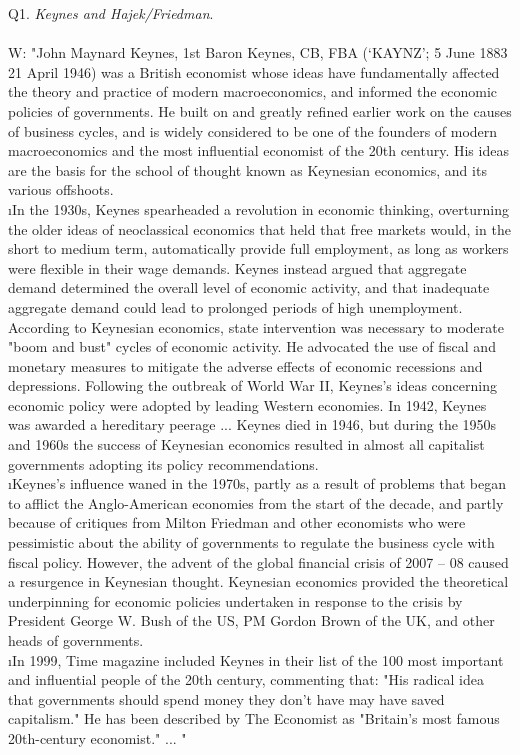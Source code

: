 \documentclass[12pt]{article}
\begin{document}
\ni Q1.  {\it Keynes and Hajek/Friedman}. \\
 \\
W: "John Maynard Keynes, 1st Baron Keynes, CB, FBA (`KAYNZ'; 5 June 1883  21 April 1946) was a British economist whose ideas have fundamentally affected the theory and practice of modern macroeconomics, and informed the economic policies of governments. He built on and greatly refined earlier work on the causes of business cycles, and is widely considered to be one of the founders of modern macroeconomics and the most influential economist of the 20th century. His ideas are the basis for the school of thought known as Keynesian economics, and its various offshoots. \\
\i In the 1930s, Keynes spearheaded a revolution in economic thinking, overturning the older ideas of neoclassical economics that held that free markets would, in the short to medium term, automatically provide full employment, as long as workers were flexible in their wage demands. Keynes instead argued that aggregate demand determined the overall level of economic activity, and that inadequate aggregate demand could lead to prolonged periods of high unemployment. According to Keynesian economics, state intervention was necessary to moderate "boom and bust" cycles of economic activity. He advocated the use of fiscal and monetary measures to mitigate the adverse effects of economic recessions and depressions. Following the outbreak of World War II, Keynes's ideas concerning economic policy were adopted by leading Western economies. In 1942, Keynes was awarded a hereditary peerage ... Keynes died in 1946, but during the 1950s and 1960s the success of Keynesian economics resulted in almost all capitalist governments adopting its policy recommendations. \\
\i Keynes's influence waned in the 1970s, partly as a result of problems that began to afflict the Anglo-American economies from the start of the decade, and partly because of critiques from Milton Friedman and other economists who were pessimistic about the ability of governments to regulate the business cycle with fiscal policy. However, the advent of the global financial crisis of 2007 -- 08 caused a resurgence in Keynesian thought. Keynesian economics provided the theoretical underpinning for economic policies undertaken in response to the crisis by President George W. Bush of the US, PM Gordon Brown of the UK, and other heads of governments. \\
\i In 1999, Time magazine included Keynes in their list of the 100 most important and influential people of the 20th century, commenting that: "His radical idea that governments should spend money they don't have may have saved capitalism." He has been described by The Economist as "Britain's most famous 20th-century economist." ... " \\
\end{document}
